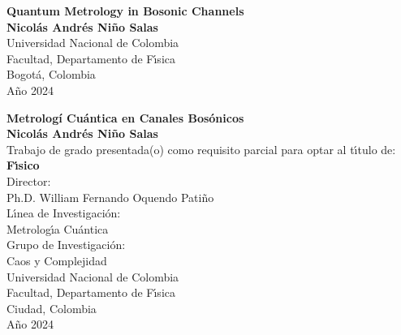 \begin{center}
\begin{figure}
\centering%
%
\end{figure}
\thispagestyle{empty} \vspace*{2.0cm} \textbf{\huge
Quantum Metrology in Bosonic Channels}\\[6.0cm]
\Large\textbf{Nicol\'{a}s Andr\'{e}s Ni\~{n}o Salas}\\[6.0cm]
\small Universidad Nacional de Colombia\\
Facultad, Departamento de F\'{\i}sica\\
Bogot\'{a}, Colombia\\
A\~{n}o 2024\\
\end{center}

\newpage{\pagestyle{empty}\cleardoublepage}

\newpage
\begin{center}
\thispagestyle{empty} \vspace*{0cm} \textbf{\huge
Metrolog\'{i} Cu\'{a}ntica en Canales Bos\'{o}nicos}\\[3.0cm]
\Large\textbf{Nicol\'{a}s Andr\'{e}s Ni\~{n}o Salas}\\[3.0cm]
\small Trabajo de grado presentada(o) como requisito parcial para optar al
t\'{\i}tulo de:\\
\textbf{F\'{\i}sico}\\[2.5cm]
Director:\\
Ph.D. William Fernando Oquendo Pati\~{n}o\\[2.0cm]
L\'{\i}nea de Investigaci\'{o}n:\\
Metrolog\'{\i}a Cu\'{a}ntica\\
Grupo de Investigaci\'{o}n:\\
Caos y Complejidad\\[2.5cm]
Universidad Nacional de Colombia\\
Facultad, Departamento de F\'{\i}sica\\
Ciudad, Colombia\\
A\~{n}o 2024\\
\end{center}

\newpage{\pagestyle{empty}\cleardoublepage}

\newpage
\thispagestyle{empty} \textbf{}\normalsize
\\\\\\%

